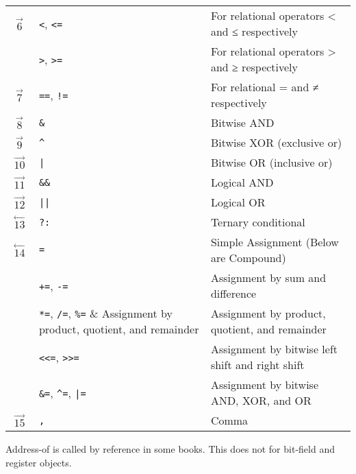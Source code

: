 \begin{center}
\begin{longtable}{|c|l|l|}
	\hline
	$\mathop{6}\limits ^{\rightarrow}$ & \verb|<|, \verb|<=| & For relational operators < and ≤ respectively \\
	\cline{2-3}
	& \verb|>|, \verb|>=| & For relational operators > and ≥ respectively \\
	\hline
	$\mathop{7}\limits ^{\rightarrow}$ 
	& \verb|==|, \verb|!=| & For relational = and ≠ respectively \\
	\hline
	$\mathop{8}\limits ^{\rightarrow}$ 
	& \verb|&| & Bitwise AND \\
	\hline
	$\mathop{9}\limits ^{\rightarrow}$ 
	& \verb|^| & Bitwise XOR (exclusive or) \\
	\hline
	$\mathop{10}\limits ^{\rightarrow}$ 
	& \verb!|! & Bitwise OR (inclusive or) \\
	\hline
	$\mathop{11}\limits ^{\rightarrow}$ 
	& \verb|&&| & Logical AND \\
	\hline
	$\mathop{12}\limits ^{\rightarrow}$ 
	& \verb!||! & Logical OR \\
	\hline
	$\mathop{13}\limits ^{\leftarrow}$
	& \verb!?:! & Ternary conditional  \\
	\hline
	$\mathop{14}\limits ^{\leftarrow}$
	& \verb|=| & Simple Assignment (Below are Compound) \\
	\cline{2-3}
	& \verb|+=|, \verb|-=| & Assignment by sum and difference \\
	\cline{2-3}
	& \verb|*=|, \verb|/=|, \verb|%=| & Assignment by product, quotient, and remainder \\
	\cline{2-3}
	& \verb|<<=|, \verb|>>=| & Assignment by bitwise left shift and right shift \\
	\cline{2-3}
	& \verb|&=|, \verb|^=|, \verb!|=! & Assignment by bitwise AND, XOR, and OR \\
	\hline
	$\mathop{15}\limits ^{\rightarrow}$ & \verb|,| & Comma \\
	\hline
\end{longtable}\end{center}

Address-of is called by reference in some books. This does not for bit-field and register objects.




